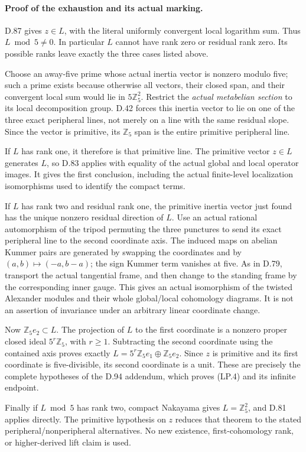 \paragraph{Proof of the exhaustion and its actual marking.}
D.87 gives \(z\in L\), with the literal uniformly convergent
local logarithm sum. Thus \(L\bmod5\ne0\). In particular
\(L\) cannot have rank zero or residual rank zero. Its
possible ranks leave exactly the three cases listed above.

Choose an away-five prime whose actual inertia vector is
nonzero modulo five; such a prime exists because otherwise
all vectors, their closed span, and their convergent local
sum would lie in \(5\mathbb Z_5^2\). Restrict the \emph{actual
metabelian section} to its local decomposition group. D.42
forces this inertia vector to lie on one of the three exact
peripheral lines, not merely on a line with the same residual
slope. Since the vector is primitive, its \(\mathbb Z_5\)
span is the entire primitive peripheral line.

If \(L\) has rank one, it therefore is that primitive line.
The primitive vector \(z\in L\) generates \(L\), so D.83
applies with equality of the actual global and local operator
images. It gives the first conclusion, including the actual
finite-level localization isomorphisms used to identify the
compact terms.

If \(L\) has rank two and residual rank one, the primitive
inertia vector just found has the unique nonzero residual
direction of \(L\). Use an actual rational automorphism of
the tripod permuting the three punctures to send its exact
peripheral line to the second coordinate axis. The induced
maps on abelian Kummer pairs are generated by swapping the
coordinates and by \((a,b)\mapsto(-a,b-a)\); the sign
Kummer term vanishes at five. As in D.79, transport the
actual tangential frame, and then change to the standing
frame by the corresponding inner gauge. This gives an actual
isomorphism of the twisted Alexander modules and their whole
global/local cohomology diagrams. It is not an assertion of
invariance under an arbitrary linear coordinate change.

Now \(\mathbb Z_5 e_2\subset L\). The projection of \(L\)
to the first coordinate is a nonzero proper closed ideal
\(5^r\mathbb Z_5\), with \(r\ge1\). Subtracting the
second coordinate using the contained axis proves exactly
\(L=5^r\mathbb Z_5e_1\oplus\mathbb Z_5e_2\).
Since \(z\) is primitive and its first coordinate is
five-divisible, its second coordinate is a unit. These are
precisely the complete hypotheses of the D.94 addendum,
which proves (LP.4) and its infinite endpoint.

Finally if \(L\bmod5\) has rank two, compact Nakayama gives
\(L=\mathbb Z_5^2\), and D.81 applies directly. The primitive
hypothesis on \(z\) reduces that theorem to the stated
peripheral/nonperipheral alternatives. No new existence,
first-cohomology rank, or higher-derived lift claim is used.
